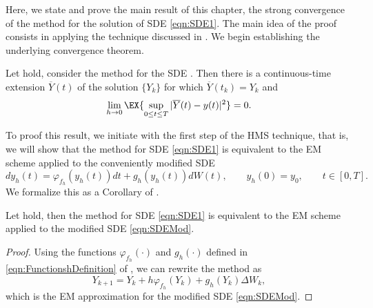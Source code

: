 	Here, we state and prove the main result of this chapter, the strong convergence of the \SM method
  for the solution of SDE \eqref{eqn:SDE1}.
The main idea of the proof consists in applying the technique discussed in .
We begin establishing the underlying convergence theorem.
\begin{thm} %
	\label{thm:StrongConvergenceLSMethod}
	Let  hold, consider the \SM method  for the 
	SDE	.
	Then there is a continuous-time extension $\overline{Y}(t)$ of the \SM solution $\{Y_k\}$ for which 
	$\overline{Y}(t_k)=Y_k$ and
	\begin{equation*}
	\lim_{h \to 0}
	\EX{
		\sup_{0\leq t \leq T}
		|\overline{Y}(t) - y(t)|^2	
	}=0.
	\end{equation*} 
\end{thm}
To proof this result, we initiate with the first step of the HMS technique, that is, we will show that the \SM method
for SDE \eqref{eqn:SDE1} is equivalent to the EM scheme applied to the conveniently modified SDE
	\begin{equation} \label{eqn:SDEMod}
		dy_h(t)= \varphi_{f_h}(y_h(t))dt +g_h(y_h(t))dW(t),
		\qquad y_h(0)=y_0,  \qquad t\in [0,T].
	\end{equation}
We formalize this as a Corollary of .

\begin{corollary}\label{col:SSSMeEMmod}
	Let  hold, then the \SM method for SDE \eqref{eqn:SDE1} is 
	equivalent to the EM scheme applied to the modified SDE \eqref{eqn:SDEMod}.
\end{corollary}
\begin{proof}
	Using the functions $\varphi_{f_h}(\cdot)$ and $g_h(\cdot)$ defined in \eqref{eqn:FunctionshDefinition} of 
	, we 
	can rewrite the \SM method  as 
	$$
		Y_{k+1} = Y_k + h \varphi_{f_h}(Y_k) + g_h(Y_k)\Delta W_k,
	$$
	which is the EM approximation for the modified SDE \eqref{eqn:SDEMod}.
\end{proof}

